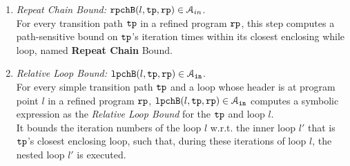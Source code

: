 \begin{enumerate}
  \item \emph{Repeat Chain Bound:} $\mathtt{rpchB}(l, \mathtt{tp}, \mathtt{rp}) \in \mathcal{A}_{in}$.
  \\
  For every transition path $\mathtt{tp}$ in a refined program $\mathtt{rp}$,
  this step computes a path-sensitive
  bound on $\mathtt{tp}$'s iteration times within its closest enclosing while loop, named \textbf{Repeat Chain} Bound.
  \item \emph{Relative Loop Bound:} $\mathtt{lpchB}(l, \mathtt{tp}, \mathtt{rp}) \in \mathcal{A}_{\mathtt{in}}$.
  \\
%
For every simple transition path $\mathtt{tp}$
and a loop whose header is at program point $l$ in a refined program $\mathtt{rp}$,
 $\mathtt{lpchB}(l, \mathtt{tp}, \mathtt{rp}) \in \mathcal{A}_{\mathtt{in}}$ computes a symbolic expression
as the \emph{Relative Loop Bound} for the $\mathtt{tp}$ and loop $l$.
\\
It bounds the iteration numbers of the loop $l$ w.r.t.
the inner loop $l'$ that is $\mathtt{tp}$'s closest enclosing loop,
such that,
during these iterations of loop $l$, the nested loop $l'$ is executed.
\end{enumerate}
